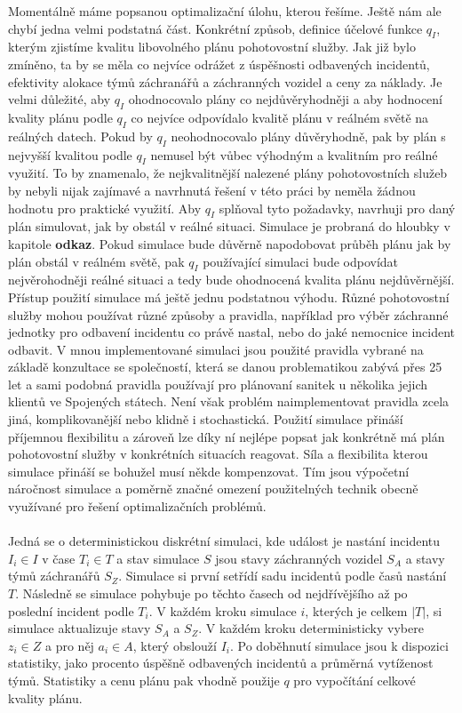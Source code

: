 Momentálně máme popsanou optimalizační úlohu, kterou řešíme. Ještě nám ale chybí jedna velmi podstatná část.
Konkrétní způsob, definice účelové funkce $q_I$, kterým zjistíme kvalitu libovolného plánu pohotovostní služby.
Jak již bylo zmíněno, ta by se měla co nejvíce odrážet z úspěšnosti odbavených incidentů, efektivity alokace týmů záchranářů a záchranných vozidel a ceny za náklady.
Je velmi důležité, aby $q_I$ ohodnocovalo plány co nejdůvěryhodněji a aby hodnocení kvality plánu podle $q_I$ co nejvíce odpovídalo kvalitě plánu v reálném světě na reálných datech.
Pokud by $q_I$ neohodnocovalo plány důvěryhodně, pak by plán s nejvyšší kvalitou podle $q_I$ nemusel být vůbec výhodným a kvalitním pro reálné využití.
To by znamenalo, že nejkvalitnější nalezené plány pohotovostních služeb by nebyli nijak zajímavé a navrhnutá řešení v této práci by neměla žádnou hodnotu pro praktické využití.
Aby $q_I$ splňoval tyto požadavky, navrhuji pro daný plán simulovat, jak by obstál v reálné situaci.
Simulace je probraná do hloubky v kapitole \textbf{odkaz}. %
Pokud simulace bude důvěrně napodobovat průběh plánu jak by plán obstál v reálném světě, pak $q_I$ používající simulaci
bude odpovídat nejvěrohodněji reálné situaci a tedy bude ohodnocená kvalita plánu nejdůvěrnější.
Přístup použití simulace má ještě jednu podstatnou výhodu.
Různé pohotovostní služby mohou používat různé způsoby a pravidla, například pro výběr záchranné jednotky pro odbavení incidentu co právě nastal, nebo do jaké nemocnice incident odbavit.
V mnou implementované simulaci jsou použité pravidla vybrané na základě konzultace se společností, která se danou problematikou zabývá přes 25 let a sami podobná pravidla používají pro plánovaní sanitek
u několika jejich klientů ve Spojených státech.
Není však problém naimplementovat pravidla zcela jiná, komplikovanější nebo klidně i stochastická.
Použití simulace přináší příjemnou flexibilitu a zároveň lze díky ní nejlépe popsat jak konkrétně má plán pohotovostní služby v konkrétních situacích reagovat.
Síla a flexibilita kterou simulace přináší se bohužel musí někde kompenzovat.
Tím jsou výpočetní náročnost simulace a poměrně značné omezení použitelných technik obecně využívané pro řešení optimalizačních problémů.
\\
\\
Jedná se o deterministickou diskrétní simulaci, kde událost je nastání incidentu $I_i \in I$ v čase $T_i \in T$ a stav simulace $S$
jsou stavy záchranných vozidel $S_A$ a stavy týmů záchranářů $S_Z$.
Simulace si první setřídí sadu incidentů podle časů nastání $T$.
Následně se simulace pohybuje po těchto časech od nejdřívějšího až po poslední incident podle $T_i$.
V každém kroku simulace $i$, kterých je celkem $|T|$, si simulace aktualizuje stavy $S_A$ a $S_Z$.
V každém kroku deterministicky vybere $z_i \in Z$ a pro něj $a_i \in A$, který obslouží $I_i$. 
Po doběhnutí simulace jsou k dispozici statistiky, jako procento úspěšně odbavených incidentů a průměrná vytíženost týmů.
Statistiky a cenu plánu pak vhodně použije $q$ pro vypočítání celkové kvality plánu.

